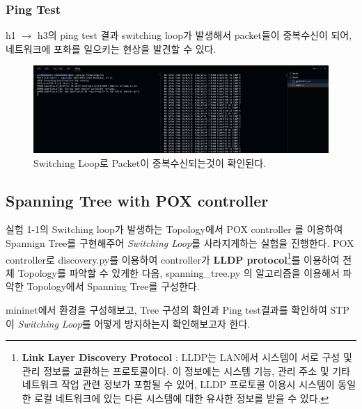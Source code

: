 \subsubsection*{Ping Test}
h1 $\to$ h3의 ping test 결과 switching loop가 발생해서 packet들이 중복수신이 되어, 네트워크에 포화를 일으키는 현상을 발견할 수 있다. \\
\vspace{-4mm}
\begin{figure}[!h]\centering 
	\includegraphics[width=.99\textwidth]{image/week08/1-1.png}
	\caption{\footnotesize
	Switching Loop로 Packet이  중복수신되는것이 확인된다. }
	\vspace{-10pt}
\end{figure}
    \vspace{-4mm}
\subsection{Spanning Tree with POX controller }
실험 1-1의 Switching loop가 발생하는 Topology에서 POX controller 를 이용하여 Spannign Tree를 구현해주어 \textit{Switching Loop}를 사라지게하는 실험을 진행한다. POX controller로 discovery.py를 이용하여 controller가 \textbf{LLDP protocol}\footnote{\textbf{Link Layer Discovery Protocol} : LLDP는 LAN에서 시스템이 서로 구성 및 관리 정보를 교환하는 프로토콜이다. 이 정보에는 시스템 기능, 관리 주소 및 기타 네트워크 작업 관련 정보가 포함될 수 있어, LLDP 프로토콜 이용시 시스템이 동일한 로컬 네트워크에 있는 다른 시스템에 대한 유사한 정보를 받을 수 있다.}를 이용하여 전체 Topology를 파악할 수 있게한 다음, spanning\_tree.py 의 알고리즘을 이용해서 파악한 Topology에서 Spanning Tree를 구성한다.

mininet에서 환경을 구성해보고, Tree 구성의 확인과 Ping test결과를 확인하여 STP이 \textit{Switching Loop}를 어떻게 방지하는지 확인해보고자 한다. 
    \vspace{-2mm}
